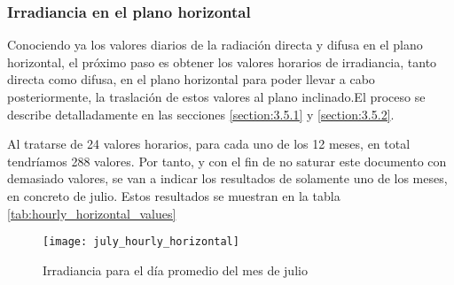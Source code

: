 \subsubsection{Irradiancia en el plano horizontal}
Conociendo ya los valores diarios de la radiación directa y difusa en el plano horizontal, el próximo paso es obtener los valores horarios de irradiancia, tanto directa como difusa, en el plano horizontal para poder llevar a cabo posteriormente, la traslación de estos valores al plano inclinado.El proceso se describe detalladamente en las secciones \ref{section:3.5.1} y \ref{section:3.5.2}.

Al tratarse de 24 valores horarios, para cada uno de los 12 meses, en total tendríamos 288 valores. Por tanto, y con el fin de no saturar este documento con demasiado valores, se van a indicar los resultados de solamente uno de los meses, en concreto de julio. Estos resultados se muestran en la tabla \ref{tab:hourly_horizontal_values}

\begin{figure}[H]
\texttt{[image: july\_hourly\_horizontal]}
\centering
\caption{Irradiancia para el día promedio del mes de julio}
\label{fig:hourly_horizontal_values}
\end{figure}

